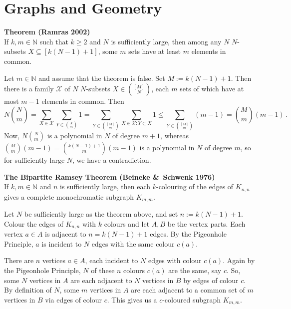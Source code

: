 \documentclass[a4paper]{article}
\let\oldendproof\endproof
\renewenvironment{proof}[1][\proofname]{%
  \oldproof[\scshape \noindent {\bfseries \text{Proof}}]%
}{\oldendproof}
\newenvironment{thm}[1]{
	\begin{framed}
	\noindent
	{\bfseries #1}\\}{
	\end{framed}
}
\newcommand{\Xf}{\mathcal{X}}
\begin{document}
\newpage
\section{Graphs and Geometry}

\begin{thm}{Theorem (Ramras 2002)}
If $k,m \in \mathbb{N}$ such that $k \geq 2$ and $N$ is sufficiently large,
then among any $N$ $N$-subsets $X \subseteq [k(N-1)+1]$,
some $m$ sets have at least $m$ elements in common.
\end{thm}

\begin{proof}
Let $m \in \mathbb{N}$ and assume that the theorem is false.
Set $M:=k(N-1)+1$.
Then there is a family $\Xf$ of $N$ $N$-subsets $X \in \binom{[M]}{N}$,
each $m$ sets of which have at most $m-1$ elements in common.
Then
\[
	N \binom{N}{m}
  = \sum_{X \in \Xf} \sum_{Y \in \binom{X}{m}} 1
  = \sum_{Y \in \binom{[M]}{m}} \sum_{X \in \Xf : Y \subset X} 1
 \leq \sum_{Y \in \binom{[M]}{m}} (m-1)
  = \binom{M}{m} (m-1)\,.
\]
Now, $N\binom{N}{m}$ is a polynomial in $N$ of degree $m+1$,
whereas $\binom{M}{m} (m-1) = \binom{k(N-1)+1}{m} (m-1)$ is a polynomial in $N$ of degree $m$,
so for sufficiently large $N$, we have a contradiction.
\end{proof}

\begin{thm}{The Bipartite Ramsey Theorem (Beineke \&\ Schwenk 1976)}
If $k,m \in \mathbb{N}$  and $n$ is sufficiently large,
then each $k$-colouring of the edges of $K_{n,n}$ gives
a complete monochromatic subgraph $K_{m,m}$.
\end{thm}

\begin{proof}
Let $N$ be sufficiently large as the theorem above,
and set $n:= k(N-1)+1$.
Colour the edges of $K_{n,n}$ with $k$ colours and let $A,B$ be the vertex parts.
Each vertex $a \in A$ is adjacent to $n= k(N-1)+1$ edges.
By the Pigeonhole Principle, $a$ is incident to $N$ edges with the same colour $c(a)$.

There are $n$ vertices $a \in A$, each incident to $N$ edges with colour $c(a)$.
Again by the Pigeonhole Principle,
$N$ of these $n$ colours $c(a)$ are the same, say $c$.
So, some $N$ vertices in $A$ are each adjacent to $N$ vertices in $B$ by edges of colour $c$.
By definition of $N$,
some $m$ vertices in $A$ are each adjacent to
a common set of $m$ vertices in $B$ via edges of colour $c$.
This gives us a $c$-coloured subgraph $K_{m,m}$.
\end{proof}
\end{document}
